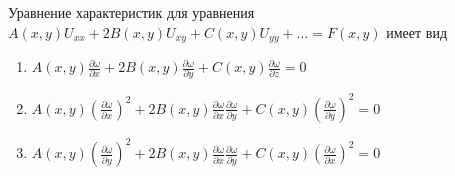 Уравнение характеристик для уравнения \(A\left(x,y\right)U_{xx}+2B\left(x,y\right)U_{xy}+C\left(x,y\right)U_{yy}+\dots =F\left(x,y\right)\) имеет вид

\begin{enumerate}[label=\arabic*)]
    \item \(A\left(x,y\right)\frac{\partial \omega }{\partial x}+2B\left(x,y\right)\frac{\partial \omega }{\partial y}+C\left(x,y\right)\frac{\partial \omega }{\partial z}=0\)
    \item \(A\left(x,y\right)\left(\frac{\partial \omega }{\partial x}\right)^2+2B\left(x,y\right)\frac{\partial \omega }{\partial x}\frac{\partial \omega }{\partial y}+C\left(x,y\right)\left(\frac{\partial \omega }{\partial y}\right)^2=0\)
    \item \(A\left(x,y\right)\left(\frac{\partial \omega }{\partial y}\right)^2+2B\left(x,y\right)\frac{\partial \omega }{\partial x}\frac{\partial \omega }{\partial y}+C\left(x,y\right)\left(\frac{\partial \omega }{\partial x}\right)^2=0\)
\end{enumerate}

